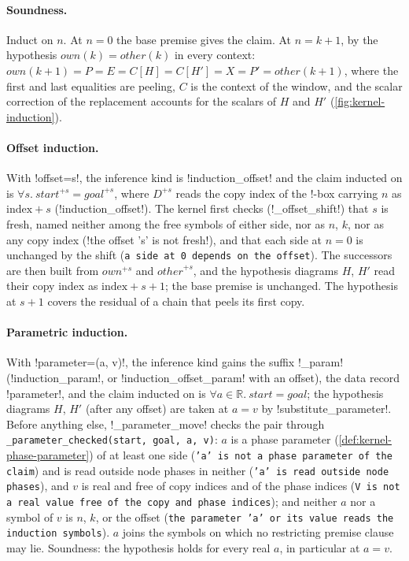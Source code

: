 \paragraph{Soundness.} Induct on $n$. At $n=0$ the base premise gives the claim. At $n=k+1$, by the hypothesis $\mathit{own}(k)=\mathit{other}(k)$ in every context: $\mathit{own}(k{+}1)=P=E=C[H]=C[H']=X=P'=\mathit{other}(k{+}1)$, where the first and last equalities are peeling, $C$ is the context of the window, and the scalar correction of the replacement accounts for the scalars of $H$ and $H'$ (\cref{fig:kernel-induction}).

\paragraph{Offset induction.} With \code!offset=s!, the inference kind is \code!induction_offset! and the claim inducted on is $\forall s.\ \mathit{start}^{+s}=\mathit{goal}^{+s}$, where $D^{+s}$ reads the copy index of the !-box carrying $n$ as $\text{index}+s$ (\py!induction_offset!). The kernel first checks (\py!_offset_shift!) that $s$ is fresh, named neither among the free symbols of either side, nor as $n$, $k$, nor as any copy index (\code!the offset 's' is not fresh!), and that each side at $n=0$ is unchanged by the shift (\texttt{a side at 0 depends on the offset}). The successors are then built from $\mathit{own}^{+s}$ and $\mathit{other}^{+s}$, and the hypothesis diagrams $H$, $H'$ read their copy index as $\text{index}+s+1$; the base premise is unchanged. The hypothesis at $s+1$ covers the residual of a chain that peels its first copy.

\paragraph{Parametric induction.} With \code!parameter=(a, v)!, the inference kind gains the suffix \code!_param! (\code!induction_param!, or \code!induction_offset_param! with an offset), the data record \code!parameter!, and the claim inducted on is $\forall a\in\mathbb{R}.\ \mathit{start}=\mathit{goal}$; the hypothesis diagrams $H$, $H'$ (after any offset) are taken at $a=v$ by \py!substitute_parameter!. Before anything else, \py!_parameter_move! checks the pair through \texttt{\_\allowbreak{}parameter\_\allowbreak{}checked(\allowbreak{}start,\allowbreak{} goal,\allowbreak{} a,\allowbreak{} v)}: $a$ is a phase parameter (\cref{def:kernel-phase-parameter}) of at least one side (\texttt{'a' is not a phase parameter of the claim}) and is read outside node phases in neither (\texttt{'a' is read outside node phases}), and $v$ is real and free of copy indices and of the phase indices (\texttt{V is not a real value free of the copy and phase indices}); and neither $a$ nor a symbol of $v$ is $n$, $k$, or the offset (\texttt{the parameter 'a' or its value reads the induction symbols}). $a$ joins the symbols on which no restricting premise clause may lie. Soundness: the hypothesis holds for every real $a$, in particular at $a=v$.

